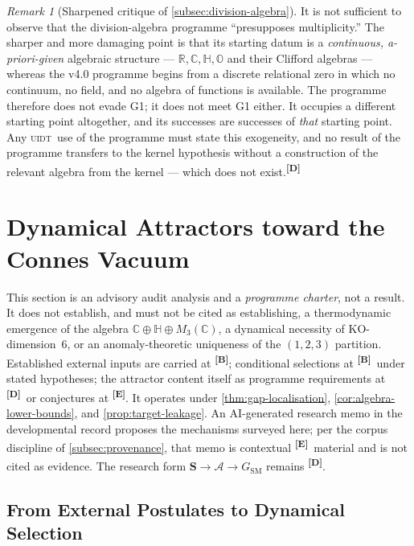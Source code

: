 \documentclass[12pt,a4paper,twoside]{article}
\theoremstyle{plain}
\theoremstyle{definition}
\theoremstyle{remark}
\newtheorem{remark}[theorem]{Remark}
\newcommand{\UIDT}{\textsc{uidt}}
\newcommand{\catmark}[1]{\textsuperscript{\textsf{\textbf{[#1]}}}}
\begin{document}
\begin{remark}[Sharpened critique of \cref{subsec:division-algebra}]
\label{rem:division-exogeneity}
It is not sufficient to observe that the division-algebra programme
``presupposes multiplicity.'' The sharper and more damaging point is
that its starting datum is a \emph{continuous, a-priori-given} algebraic
structure --- $\mathbb R, \mathbb C, \mathbb H, \mathbb O$ and their
Clifford algebras --- whereas the v4.0 programme begins from a discrete
relational zero in which no continuum, no field, and no algebra of
functions is available. The programme therefore does not evade G1; it
does not meet G1 either. It occupies a different starting point
altogether, and its successes are successes of \emph{that} starting
point. Any \UIDT\ use of the programme must state this exogeneity, and no
result of the programme transfers to the kernel hypothesis without a
construction of the relevant algebra from the kernel --- which does not
exist.\catmark{D}
\end{remark}

\section{Dynamical Attractors toward the Connes Vacuum}
\label{sec:connes-attractor}

\begin{governancebox}
This section is an advisory audit analysis and a \emph{programme
charter}, not a result. It does not establish, and must not be cited as
establishing, a thermodynamic emergence of the algebra
$\mathbb{C}\oplus\mathbb{H}\oplus M_3(\mathbb{C})$, a dynamical necessity
of KO-dimension~6, or an anomaly-theoretic uniqueness of the $(1,2,3)$
partition. Established external inputs are carried at \catmark{B};
conditional selections at \catmark{B}\ under stated hypotheses; the
attractor content itself as programme requirements at \catmark{D}\ or
conjectures at \catmark{E}. It operates under
\cref{thm:gap-localisation}, \cref{cor:algebra-lower-bounds}, and
\cref{prop:target-leakage}. An AI-generated research memo in the
developmental record proposes the mechanisms surveyed here; per the
corpus discipline of \cref{subsec:provenance}, that memo is contextual
\catmark{E}\ material and is not cited as evidence. The research form
$\mathbf S \to \mathcal A \to G_{\mathrm{SM}}$ remains \catmark{D}.
\end{governancebox}

\subsection{From External Postulates to Dynamical Selection}
\label{subsec:attractor-programme}
\end{document}
